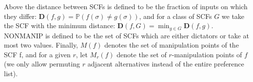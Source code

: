 	Above the distance between SCFs is defined to be the fraction of inputs on which they differ: $\mathbf{D}(f, g) = \mathbb{P}(f (\sigma) \ne g(\sigma))$, and for a class of SCFs $G$ we take the SCF with the minimum distance: $\mathbf{D}(f, G) = \min_{g \in G} \mathbf{D}(f, g)$. NONMANIP is defined to be the set of SCFs which are either dictators or take at most two values. Finally, $M(f)$ denotes the set of manipulation points of the SCF f, and for a given $r$, let $M_r(f)$ denote the set of $r$-manipulation points of $f$ (we only allow permuting $r$ adjacent alternatives instead of the entire preference list).
